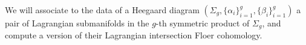 

We will associate to the data of a Heegaard diagram $(\Sigma_g, \{\alpha_i\}_{i=1}^g, \{\beta_i\}_{i=1}^g)$ a pair of Lagrangian submanifolds in the $g$-th symmetric product of $\Sigma_g$, and compute a version of their Lagrangian intersection Floer cohomology. 


